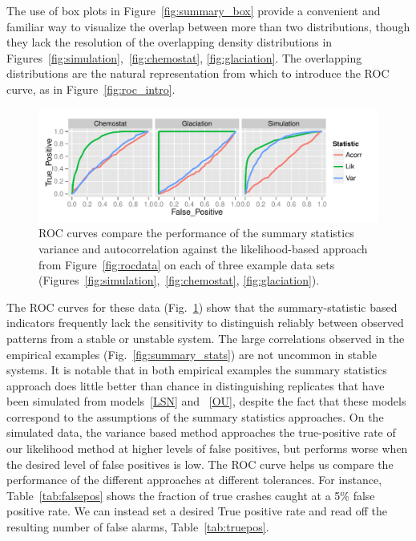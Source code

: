 \documentclass[authoryear,review,11pt]{elsarticle}
\begin{document}
The use of box plots in Figure~\ref{fig:summary_box} provide a convenient and familiar way 
to visualize the overlap between more than two distributions,
though they lack the resolution of the overlapping density distributions in 
Figures~\ref{fig:simulation},~\ref{fig:chemostat}, \ref{fig:glaciation}.  
The overlapping distributions are the natural representation from which to introduce the ROC curve, as in Figure~\ref{fig:roc_intro}.  




 \begin{figure}
   \begin{center}
     \includegraphics[width=\linewidth]{figures/summary_roc.pdf}
     \caption{ROC curves compare the performance of the summary statistics variance and autocorrelation against the likelihood-based approach from Figure~\ref{fig:rocdata} on each of three example data sets (Figures~\ref{fig:simulation},~\ref{fig:chemostat}, \ref{fig:glaciation}).}
     \label{fig:summary_roc}
  \end{center}
 \end{figure}



 The ROC curves for these data (Fig.~\ref{fig:summary_roc}) show that the summary-statistic based indicators
frequently lack the sensitivity to distinguish reliably between observed patterns from a stable or unstable system.
The large correlations observed in the empirical examples (Fig.~\ref{fig:summary_stats}) are not uncommon in stable systems.
It is notable that in both empirical examples the summary statistics approach does little better than chance in distinguishing 
replicates that have been simulated from models~\eqref{LSN} and ~\eqref{OU}, 
despite the fact that these models correspond 
to the assumptions of the summary statistics approaches.  
On the simulated data, the variance based method approaches the 
true-positive rate of our likelihood method at higher levels of false positives, 
but performs worse when the desired level of false positives is low.  
The ROC curve helps us compare the performance of the different approaches at different tolerances.  
For instance, Table~\ref{tab:falsepos} shows the fraction of true crashes caught at a 5\% false positive rate.
We can instead set a desired True positive rate and read off the resulting number of false alarms, Table~\ref{tab:truepos}.  
\end{document}

